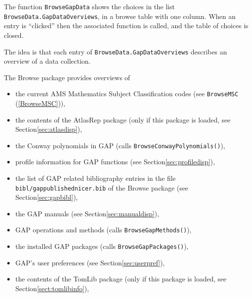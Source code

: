 \documentclass[a4paper,11pt]{report}
\begin{document}
{{{ The function \texttt{BrowseGapData} shows the choices in the list \texttt{BrowseData.GapDataOverviews}, in a browse table with one column. When an entry is ``clicked'' then the associated function is called, and the table of choices is closed. 

 The idea is that each entry of \texttt{BrowseData.GapDataOverviews} describes an overview of a data collection. 

 The \textsf{Browse} package provides overviews of 
\begin{itemize}
\item  the current AMS Mathematics Subject Classification codes (see \texttt{BrowseMSC} (\ref{BrowseMSC})), 
\item  the contents of the \textsf{AtlasRep} package \cite{AtlasRep} (only if this package is loaded, see Section{\nobreakspace}\ref{sec:atlasdisp}), 
\item  {} the Conway polynomials in \textsf{GAP} (calls \texttt{BrowseConwayPolynomials()}), 
\item  profile information for \textsf{GAP} functions (see Section{\nobreakspace}\ref{sec:profiledisp}), 
\item  the list of \textsf{GAP} related bibliography entries in the file \texttt{bibl/gap\texttt{}publishednicer.bib} of the \textsf{Browse} package (see Section{\nobreakspace}\ref{sec:gapbibl}), 
\item  the \textsf{GAP} manuals (see Section{\nobreakspace}\ref{sec:manualdisp}), 
\item  {} \textsf{GAP} operations and methods (calls \texttt{BrowseGapMethods()}), 
\item  {} the installed \textsf{GAP} packages (calls \texttt{BrowseGapPackages()}), 
\item  \textsf{GAP}'s user preferences (see Section{\nobreakspace}\ref{sec:userpref}), 
\item  the contents of the \textsf{TomLib} package \cite{TomLib} (only if this package is loaded, see Section{\nobreakspace}\ref{sect:tomlibinfo}), 
\end{itemize}
 

}}}
\end{document}
